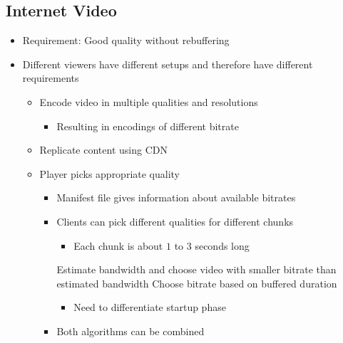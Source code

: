 \subsection{Internet Video}
\begin{itemize}
    \item Requirement: Good quality without rebuffering
    \item Different viewers have different setups and therefore have different requirements
        \begin{itemize}
            \item Encode video in multiple qualities and resolutions
                \begin{itemize}
                    \item Resulting in encodings of different bitrate
                \end{itemize}
            \item Replicate content using CDN
            \item Player picks appropriate quality
                \begin{itemize}
                    \item Manifest file gives information about available bitrates
                    \item Clients can pick different qualities for different chunks
                        \begin{itemize}
                            \item Each chunk is about $1$ to $3$ seconds long
                        \end{itemize}
                     Estimate bandwidth and choose video with smaller bitrate than estimated bandwidth
                     Choose bitrate based on buffered duration
                        \begin{itemize}
                            \item Need to differentiate startup phase
                        \end{itemize}
                    \item Both algorithms can be combined
                \end{itemize}
        \end{itemize}
\end{itemize}
